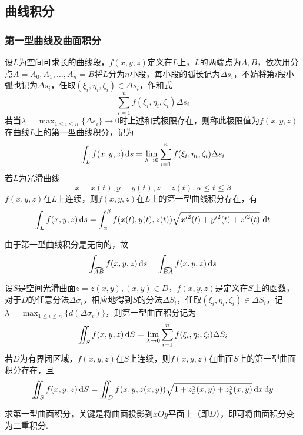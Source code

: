\subsection{曲线积分}
\subsubsection{第一型曲线及曲面积分}
\begin{definition}[第一型曲线积分]
设$L$为空间可求长的曲线段，$f(x,y,z)$定义在$L$上，$L$的两端点为$A,B$，依次用分点$A=A_0,A_1,\ldots,A_n=B$将$L$分为$n$小段，每小段的弧长记为$\Delta s_i$，不妨将第$i$段小弧也记为$\Delta s_i$，任取$(\xi_i,\eta_i,\zeta_i)\in\Delta s_i$，作和式
\[\sum_{i=1}^n f(\xi_i,\eta_i,\zeta_i)\Delta s_i\]
若当$\lambda=\max_{1\leq i\leq n}\{\Delta s_i\}\to 0$时上述和式极限存在，则称此极限值为$f(x,y,z)$在曲线$L$上的第一型曲线积分，记为
\[\int_Lf(x,y,z)\,\mathrm{d} s=\lim_{\lambda\to 0}\sum_{i=1}^nf(\xi_i,\eta_i,\zeta_i)\Delta s_i\]
若$L$为光滑曲线
\[x=x(t),y=y(t),z=z(t),\alpha\leq t\leq\beta\]
$f(x,y,z)$在$L$上连续，则$f(x,y,z)$在$L$上的第一型曲线积分存在，有
\[\int_Lf(x,y,z)\,\mathrm{d} s=\displaystyle\int_{\alpha}^{\beta}{f(x(t),y(t),z(t))\sqrt{{x'}^2(t)+{y'}^2(t)+{z'}^2(t)}}\,\,\mathrm{d} t\]
\end{definition}
由于第一型曲线积分是无向的，故
\[\int_{\wideparen{AB}}f(x,y,z)\diff s=\int_{\wideparen{BA}}f(x,y,z)\diff s\]
\begin{definition}[第一型曲面积分]
设$S$是空间光滑曲面$z=z(x,y),(x,y)\in D$，$f(x,y,z)$是定义在$S$上的函数，对于$D$的任意分法$\Delta\sigma_i$，相应地得到$S$的分法$\Delta S_i$，任取$(\xi_i,\eta_i,\zeta_i)\in\Delta S_i$，记$\lambda=\max_{1\leq i\leq n}\{d(\Delta\sigma_i)\}$，则第一型曲面积分记为
\[\iint_S f(x,y,z)\,\mathrm{d} S=\lim_{\lambda\to 0}\sum_{i=1}^n f(\xi_i,\eta_i,\zeta_i)\Delta S_i\]
若$D$为有界闭区域，$f(x,y,z)$在$S$上连续，则$f(x,y,z)$在曲面$S$上的第一型曲面积分存在，且
\[\iint_S f(x,y,z)\,\mathrm{d} S=\iint_D f(x,y,z(x,y))\sqrt{1+z_x^2(x,y)+z_y^2(x,y)}\,\mathrm{d} x\,\mathrm{d} y\]
\end{definition}
求第一型曲面积分，关键是将曲面投影到$xOy$平面上（即$D$），即可将曲面积分变为二重积分.

